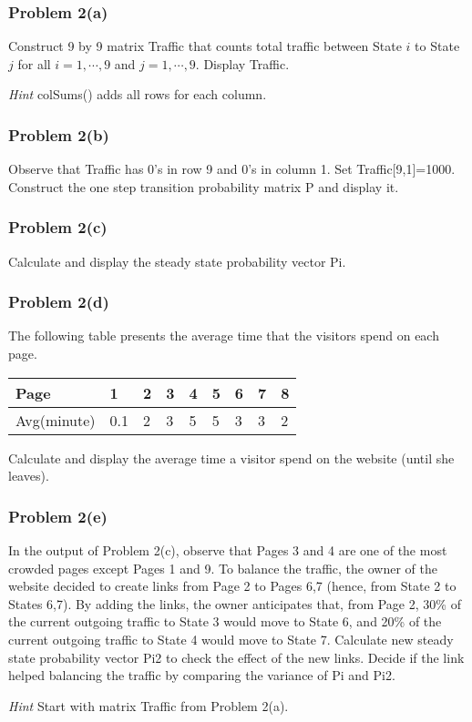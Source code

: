 \documentclass{article}
\begin{document}
\subsubsection*{Problem 2(a)}
Construct 9 by 9 matrix \textsf{Traffic} that counts total traffic between State $i$ to State $j$ for all $i=1,\cdots,9$ and $j=1,\cdots,9$. Display \textsf{Traffic}.

\noindent \textit{Hint} \textsf{colSums()} adds all rows for each column.



\subsubsection*{Problem 2(b)}
Observe that \textsf{Traffic} has 0's in row 9 and 0's in column 1. Set \textsf{Traffic}[9,1]=1000.  Construct the one step transition probability matrix \textsf{P} and display it.



\subsubsection*{Problem 2(c)}
Calculate and display the steady state probability vector \textsf{Pi}.






\subsubsection*{Problem 2(d)}
The following table presents the average time that the visitors spend on each page.
\vspace{0.3cm}

\begin{tabular}{|l|llllllll|}
\hline
Page & 1 & 2 & 3 & 4 & 5 & 6 & 7 & 8\\ \hline
Avg(minute) & 0.1 & 2 & 3 & 5 & 5 & 3 & 3 & 2 \\  \hline
\end{tabular}
\vspace{0.3cm}

\noindent Calculate and display the average time a visitor spend on the website (until she leaves).



\subsubsection*{Problem 2(e)}
In the output of Problem 2(c), observe that Pages 3 and 4 are one of the most crowded pages except Pages 1 and 9. To balance the traffic, the owner of the website decided to create links from Page 2 to Pages 6,7 (hence, from State 2 to States 6,7). By adding the links, the owner anticipates that, from Page 2, 30\% of the current outgoing traffic to State 3 would move to State 6, and 20\% of the current outgoing traffic to State 4 would move to State 7. Calculate new steady state probability vector \textsf{Pi2} to check the effect of the new links. Decide if the link helped balancing the traffic by comparing the variance of \textsf{Pi} and \textsf{Pi2}.

\noindent \textit{Hint} Start with matrix \textsf{Traffic} from Problem 2(a).
\end{document}
